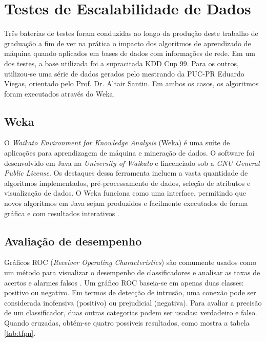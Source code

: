 \chapter{Testes de Escalabilidade de Dados}
Três baterias de testes foram conduzidas ao longo da produção deste trabalho de graduação a fim de ver na prática o
impacto dos algoritmos de aprendizado de máquina quando aplicados em bases de dados com informações de rede.
Em um dos testes, a base utilizada foi a supracitada KDD Cup 99. Para os outros, utilizou-se uma série de dados
 gerados pelo mestrando da PUC-PR Eduardo Viegas, orientado pelo Prof. Dr. Altair Santin. Em ambos os casos, os algoritmos foram
 executados através do Weka.

\section{Weka}
O \textit{Waikato Environment for Knowledge Analysis} (Weka) é uma suíte de aplicações para aprendizagem de máquina e
mineração de dados. O software foi desenvolvido em Java na \textit{University of Waikato} e lincenciado sob a
\textit{GNU General Public License}. Os destaques dessa ferramenta incluem a vasta quantidade de algoritmos
implementados, pré-processamento de dados, seleção de atributos e visualização de dados. O Weka funciona como uma
interface, permitindo que novos algoritmos em Java sejam produzidos e facilmente executados de forma gráfica e com
resultados interativos \cite{bouckaert10}.

\section{Avaliação de desempenho}
Gráficos ROC (\textit{Receiver Operating Characterístics}) são comumente usados como um método  para visualizar
o desempenho de classificadores e analisar as taxas de acertos e alarmes falsos \cite{fawcett04}. Um gráfico ROC
baseia-se em apenas duas classes: positivo ou negativo. Em termos de detecção de intrusão, uma conexão pode ser
considerada inofensiva (positivo) ou prejudicial (negativa). Para avaliar a precisão de um classificador,
duas outras categorias podem ser usadas: verdadeiro e falso. Quando cruzadas, obtém-se quatro possíveis resultados,
como mostra a tabela \ref{tab:tfpn}.

